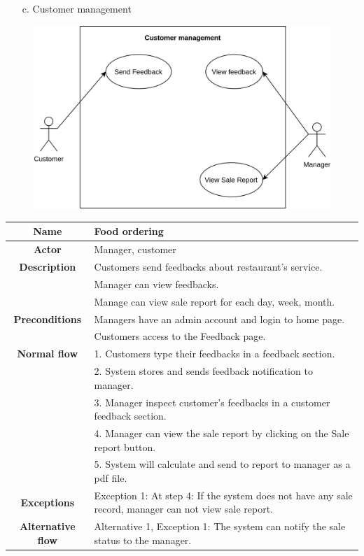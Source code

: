 \documentclass[11pt]{article}
\begin{document}
\cleardoublepage
    \begin{enumerate}
        \item[c.] Customer management
    \end{enumerate}
    \begin{figure}[h]
        \centering
        \includegraphics[scale=0.3]{Use-case diagram/CustomerManagement.png}
    \end{figure}
    \begin{table}[!h]
    \centering
        \begin{tabular}{|c|p{14cm}|}
        \hline
        \textbf{Name}  & \textbf{Food ordering} \\
        \hline
        \textbf{Actor} & Manager, customer\\
        \hline
        \textbf{Description} & Customers send feedbacks about restaurant's service.\\
        {} & Manager can view feedbacks.\\
        {} & Manage can view sale report for each day, week, month.\\
        \hline
        \textbf{Preconditions} & Managers have an admin account and login to home page.\\
        {} & Customers access to the Feedback page.\\
        \hline
        \textbf{Normal flow} & 1. Customers type their feedbacks in a feedback section.\\
        {} & 2. System stores and sends feedback notification to manager. \\
        {} & 3. Manager inspect customer's feedbacks in a customer feedback section.\\
        {} & 4. Manager can view the sale report by clicking on the Sale report button. \\
        {} & 5. System will calculate and send to report to manager as a pdf file. \\ 
        \hline
        \textbf{Exceptions} & Exception 1: At step 4: If the system does not have any sale record, manager can not view sale report.\\
        \hline
        \textbf{Alternative flow} & Alternative 1, Exception 1: The system can notify the sale status to the manager.\\
        \hline
        \end{tabular}
    \end{table}
\cleardoublepage
\end{document}
